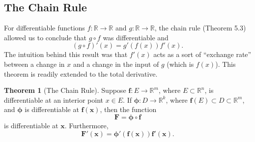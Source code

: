 \documentclass{article}
\newcommand{\R}{\mathbb{R}}
\newcommand{\x}{\mathbf{x}}
\newcommand{\f}{\mathbf{f}}
\theoremstyle{definition}
\newtheorem{theorem}{Theorem}[section]
\begin{document}
	\subsection{The Chain Rule}
	For differentiable functions $ f:\R\to\R $ and $ g:\R\to\R $, the chain rule (Theorem 5.3) allowed us to conclude that $ g\circ f $ was differentiable and $$ (g\circ f)'(x)=g'(f(x))f'(x).$$ The intuition behind this result was that $ f'(x) $ acts as a sort of ``exchange rate'' between a change in $ x $ and a change in the input of $ g $ (which is $ f(x) $). This theorem is readily extended to the total derivative.
	\begin{theorem}[The Chain Rule]
		Suppose $ \f:E\to\R^m $, where $ E\subset \R^n $, is differentiable at an interior point $ x\in E $. If $ \boldsymbol{\phi}:D\to \R^k $, where $ \f(E)\subset D\subset \R^m $, and $ \boldsymbol{\phi} $ is differentiable at $ \f(\x) $, then the function $$\mathbf F=\boldsymbol{\phi} \circ \f $$ is differentiable at $ \x$. Furthermore, 
		$$ \mathbf F'(\x)= \boldsymbol{\phi}'(\f(\x))\f'(\x).$$
	\end{theorem}
\end{document}
